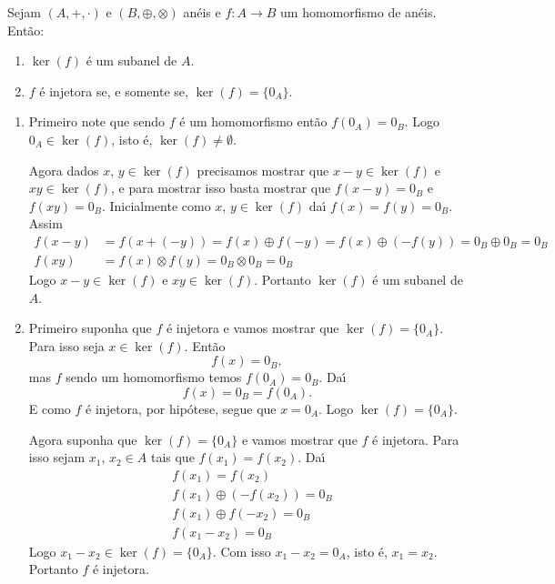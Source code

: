 \begin{proposicao}
	Sejam $(A, +, \cdot)$ e $(B, \oplus, \otimes)$ an\'eis e $f : A \to B$ um homomorfismo de an\'eis. Ent\~ao:
	\begin{enumerate}[label={\roman*})]
		\item $\ker(f)$ \'e um subanel de $A$.
		\item $f$ \'e injetora se, e somente se, $\ker(f) = \{0_A\}$.
	\end{enumerate}
\end{proposicao}
\begin{prova}
	\begin{enumerate}[label={\roman*})]
		\item Primeiro note que sendo $f$ \'e um homomorfismo ent\~ao $f(0_A) = 0_B$. Logo $0_A \in \ker(f)$, isto \'e, $\ker(f) \ne \emptyset$.

		Agora dados $x$, $y \in \ker(f)$ precisamos mostrar que $x - y \in \ker(f)$ e $xy \in \ker(f)$, e para mostrar isso basta mostrar que $f(x - y) = 0_B$ e$f(xy) = 0_B$. Inicialmente como $x$, $y \in \ker(f)$ da{\'\i} $f(x) = f(y) = 0_B$. Assim
		\begin{align*}
			f(x - y) &= f(x + (-y)) = f(x) \oplus f(-y) = f(x) \oplus (-f(y)) = 0_B \oplus 0_B = 0_B\\
			f(xy) &= f(x)\otimes f(y) = 0_B \otimes 0_B = 0_B
		\end{align*}
		Logo $x - y \in \ker(f)$ e $xy \in \ker(f)$. Portanto $\ker(f)$ \'e um subanel de $A$.

		\item Primeiro suponha que $f$ \'e injetora e vamos mostrar que $\ker(f) = \{0_A\}$. Para isso seja $x \in \ker(f)$. Ent\~ao
		\[
			f(x) = 0_B,
		\]
		mas $f$ sendo um homomorfismo temos $f(0_A) = 0_B$. Da{\'\i}
		\[
			f(x) = 0_B = f(0_A).
		\]
		E como $f$ \'e injetora, por hip\'otese, segue que $x = 0_A$. Logo $\ker(f) = \{0_A\}$.

		Agora suponha que $\ker(f) = \{0_A\}$ e vamos mostrar que $f$ \'e injetora. Para isso sejam $x_1$, $x_2 \in A$ tais que $f(x_1) = f(x_2)$. Da{\'\i}
		\begin{align*}
			&f(x_1) = f(x_2)\\
			&f(x_1) \oplus (-f(x_2)) = 0_B\\
			&f(x_1) \oplus f(-x_2) = 0_B\\
			&f(x_1 - x_2) = 0_B
		\end{align*}
		Logo $x_1 - x_2 \in \ker(f) = \{0_A\}$. Com isso $x_1 - x_2 = 0_A$, isto \'e, $x_1 = x_2$. Portanto $f$ \'e injetora.
	\end{enumerate}
\end{prova}

